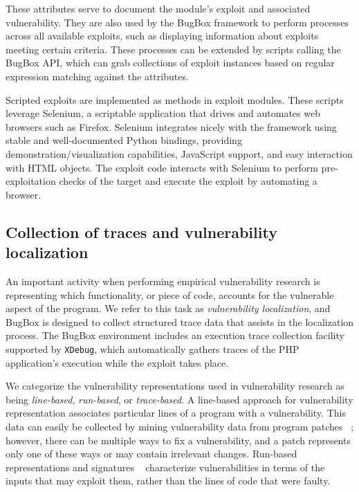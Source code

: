 \documentclass[letterpaper,twocolumn,10pt]{article}
\begin{document}
These attributes serve to document the module's exploit and associated vulnerability. They are also used by the BugBox framework to perform processes across all available exploits, such as displaying information about exploits meeting certain criteria. These processes can be extended by scripts calling the BugBox API, which can grab collections of exploit instances based on regular expression matching against the attributes.

Scripted exploits are implemented as methods in exploit modules. These scripts leverage Selenium, a scriptable application that drives and automates web browsers such as Firefox. Selenium integrates nicely with the framework using stable and well-documented Python bindings, providing demonstration/visualization capabilities, JavaScript support, and easy interaction with HTML objects. The exploit code interacts with Selenium to perform pre-exploitation checks of the target and execute the exploit by automating a browser.

\subsection{Collection of traces and vulnerability localization}

An important activity when performing empirical vulnerability research is representing which functionality, or piece of code, accounts for the vulnerable aspect of the program. We refer to this task as \emph{vulnerability localization}, and BugBox is designed to collect structured trace data that assists in the localization process. The BugBox environment includes an execution trace collection facility supported by \texttt{XDebug}, which automatically gathers traces of the PHP application's execution while the exploit takes place.

We categorize the vulnerability representations used in vulnerability research as being \textit{line-based}, \textit{run-based}, or \textit{trace-based}. A line-based approach for vulnerability representation associates particular lines of a program with a vulnerability. This data can easily be collected by mining vulnerability data from program patches ~\cite{4630094}; however, there can be multiple ways to fix a vulnerability, and a patch represents only one of these ways or may contain irrelevant changes.  Run-based representations and signatures ~\cite{Song:2008:BNA:1496255.1496257} characterize vulnerabilities in terms of the inputs that may exploit them, rather than the lines of code that were faulty.
\end{document}
